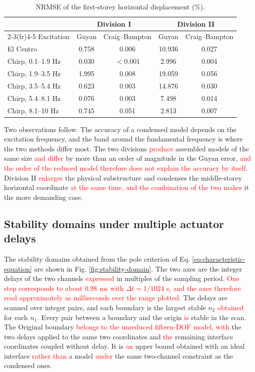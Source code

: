 \documentclass[11pt,a4paper]{article}
\numberwithin{equation}{section}
\newcommand{\rev}[1]{\textcolor{red}{#1}}
\begin{document}
\begin{table}[htbp]
	\centering
	\caption{NRMSE of the first-storey horizontal displacement (\%).}
	\label{tab:nrmse}
	\begin{tabular}{lcccc}
		\toprule
		& \multicolumn{2}{c}{Division I} & \multicolumn{2}{c}{Division II}\\
		\cmidrule(lr){2-3}\cmidrule(lr){4-5}
		Excitation & Guyan & Craig--Bampton & Guyan & Craig--Bampton\\
		\midrule
		El Centro           & 0.758 & 0.006    & 10.936 & 0.027\\
		\midrule
		Chirp, 0.1--1.9 Hz  & 0.030 & $<$0.001 & 2.996  & 0.004\\
		Chirp, 1.9--3.5 Hz  & 1.995 & 0.008    & 19.059 & 0.056\\
		Chirp, 3.5--5.4 Hz  & 0.623 & 0.003    & 14.876 & 0.030\\
		Chirp, 5.4--8.1 Hz  & 0.076 & 0.003    & 7.498  & 0.014\\
		Chirp, 8.1--10 Hz   & 0.745 & 0.051    & 2.813  & 0.007\\
		\bottomrule
	\end{tabular}
\end{table}

Two observations follow. The accuracy of a condensed model depends on the excitation frequency, and the band around the fundamental frequency is where the two methods differ most. The two divisions \rev{produce} assembled models of the same size \rev{and differ} by more than an order of magnitude in the Guyan error, \rev{and the order of the reduced model therefore does not explain the accuracy by itself}. Division II \rev{enlarges} the physical substructure and condenses the middle-storey horizontal coordinate\rev{ at the same time, and the combination of the two makes} it the more demanding case.

\subsection{Stability domains under multiple actuator delays}
\label{sec:stability-domains}

The stability domains obtained from the pole criterion of Eq. \eqref{eq:characteristic-equation} are shown in Fig. \ref{fig:stability-domain}. The two axes are the integer delays of the two channels\rev{ expressed} in multiples of the sampling period. \rev{One step corresponds to about 0.98 ms with \(\Delta t=1/1024\) s, and the axes therefore read approximately as milliseconds over the range plotted}. The delays are scanned over integer pairs, and each boundary is the largest stable \(n_{2}\) \rev{obtained} for each \(n_{1}\). Every pair between a boundary and the origin \rev{is} stable in the scan. The Original boundary \rev{belongs to the unreduced fifteen-DOF model, with} the two delays applied to the same two coordinates and \rev{the} remaining interface coordinates coupled without delay. It is \rev{an} upper bound obtained with an ideal interface\rev{ rather than} a model \rev{under} the same two-channel constraint as the condensed ones.
\end{document}
